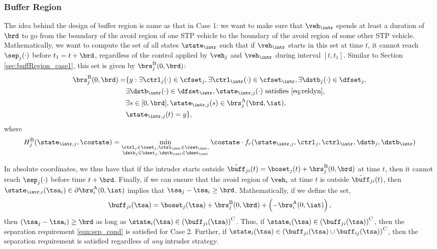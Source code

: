 \subsubsection{Buffer Region} \label{sec:buffRegion_case2}
The idea behind the design of buffer region is same as that in Case 1: we want to make sure that $\veh_{\intr}$ spends at least a duration of $\brd$ to go from the boundary of the avoid region of one STP vehicle to the boundary of the avoid region of some other STP vehicle. Mathematically, we want to compute the set of all states $\state_{\intr}$ such that if $\veh_{\intr}$ starts in this set at time $t$, it cannot reach $\sep_j(\cdot)$ before $t_1 = t + \brd$, regardless of the control applied by $\veh_j$ and $\veh_{\intr}$ during interval $[t, t_1]$. Similar to Section \ref{sec:buffRegion_case1}, this set is given by $\brs^{\text{B}}_{j}(0, \brd)$: 
\begin{equation} \label{eqn:buffBRS_case2}
\begin{aligned}
\brs^{\text{B}}_{j}(0, \brd) = & \{y: \exists \ctrl_j(\cdot) \in \cfset_j, \exists \ctrl_\intr(\cdot) \in \cfset_\intr, \exists \dstb_j(\cdot) \in \dfset_j, \\
& \exists \dstb_\intr(\cdot) \in \dfset_\intr, \state_{\intr, j}(\cdot) \text{ satisfies \eqref{eq:reldyn}},\\
& \exists s \in [0, \brd], \state_{\intr, j}(s) \in \brs^{\text{A}}_{j}(\brd, \iat),\\
& \state_{\intr, j}(t) = y\},
\end{aligned}
\end{equation}
where 
\begin{equation}
H^{\text{B}}_{j}(\state_{\intr, j}, \costate) = \min_{\substack{\ctrl_j \in \cset_j, \ctrl_\intr \in \cset_\intr, \\ \dstb_j \in \dset_j, \dstb_\intr \in \dset_\intr}} \costate \cdot f_r(\state_{\intr, j}, \ctrl_j, \ctrl_\intr, \dstb_j, \dstb_\intr)
\end{equation}

In absolute coordinates, we thus have that if the intruder starts outside $\tilde{\buff}_{ji}(t) = \boset_j(t) + \brs^{\text{B}}_{j}(0, \brd)$ at time $t$, then it cannot reach $\sep_j(\cdot)$ before time $t + \brd$. Finally, if we can ensure that the avoid region of $\veh_i$ at time $t$ is outside $\tilde{\buff}_{ji}(t)$, then $\state_{\intr, i}(\tsa_i) \in \partial \brs^{\text{A}}_{i}(0, \iat)$ implies that $\tsa_j - \tsa_i \geq \brd$. Mathematically, if we define the set,  
\begin{equation} \label{eqn:buffRegion_case2}
\buff_{ji}(\tsa) = \boset_j(\tsa) + \brs^{\text{B}}_{j}(0, \brd) + \left(-\brs^{\text{A}}_{i}(0, \iat)\right),
\end{equation} 
then $(\tsa_j - \tsa_i) \geq \brd$ as long as $\state_i(\tsa) \in \left(\buff_{ji}(\tsa)\right)^C$. Thus, if $\state_i(\tsa) \in \left(\buff_{ji}(\tsa)\right)^C$, then the separation requirement \eqref{eqn:sep_cond} is satisfied for Case 2. Further, if $\state_i(\tsa) \in \left(\buff_{ji}(\tsa) \cup \buff_{ij}(\tsa)\right)^C$, then the separation requirement is satisfied regardless of \textit{any} intruder strategy. 

